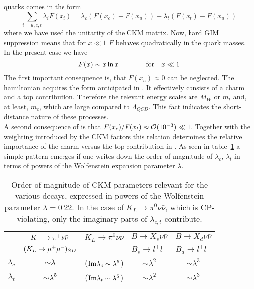quarks comes in the form
\begin{equation}\label{lifx}
\sum_{i=u, c, t}\lambda_i F(x_i)=
\lambda_c(F(x_c)-F(x_u))+\lambda_t(F(x_t)-F(x_u))  \end{equation}
where we have used the unitarity of the CKM matrix. Now, hard GIM
suppression means that for $x\ll 1$ $F$ behaves quadratically in
the quark masses. In the present case we have
\begin{equation}\label{fxln}
F(x)\sim x\ln x\qquad\qquad  {\rm for}\quad x\ll 1   \end{equation}
The first important consequence is, that $F(x_u)\approx 0$ can be
neglected. The hamiltonian acquires the form anticipated in .
It effectively consists of a charm and a top contribution. Therefore
the relevant energy scales are $M_W$ or $m_t$ and, at least, $m_c$,
which are large compared to $\Lambda_{QCD}$. This fact indicates the
short-distance nature of these processes.\\
A second consequence of  is that $F(x_c)/F(x_t)\approx
{\cal O}(10^{-3})\ll 1$. Together with the weighting introduced by the
CKM factors this relation determines the relative importance of
the charm versus the top contribution in . As seen in
table~\ref{tab:lambdaexp} a simple pattern emerges if one writes down
the order of magnitude of $\lambda_c$, $\lambda_t$ in terms of powers
of the Wolfenstein expansion parameter $\lambda$.

\begin{table}[htb]
\caption[]{
Order of magnitude of CKM parameters relevant for the various decays,
expressed in powers of the Wolfenstein parameter $\lambda=0.22$. In the
case of $K_L\to\pi^0\nu\bar\nu$, which is CP-violating, only the
imaginary parts of $\lambda_{c, t}$ contribute.
\label{tab:lambdaexp}}
\begin{center}
\begin{tabular}{|r|c|c|c|c|}
&$K^+ \to \pi^+\nu\bar\nu$&$K_L\to\pi^0\nu\bar\nu$&$B\to X_s\nu\bar\nu$&
$B\to X_d\nu\bar\nu$\\
&$(K_L \to \mu^+\mu^-)_{SD}$&&$B_s\to l^+l^-$&$B_d\to l^+l^-$\\  \hline\hline
$\lambda_c$&$\sim\lambda$&(${\rm Im}\lambda_c\sim\lambda^5$)&
$\sim\lambda^2$&$\sim\lambda^3$\\  \hline
$\lambda_t$&$\sim\lambda^5$&(${\rm Im}\lambda_t\sim\lambda^5$)&
$\sim\lambda^2$&$\sim\lambda^3$
\end{tabular}
\end{center}
\end{table}

